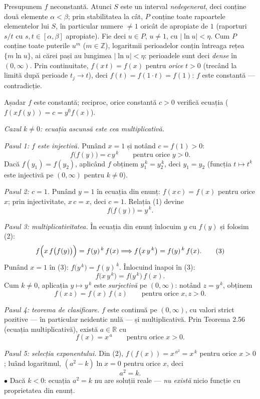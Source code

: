 Presupunem $f$ neconstantă. Atunci $S$ este un interval \emph{nedegenerat}, deci conține două elemente $\alpha<\beta$; prin stabilitatea la cât, $P$ conține toate rapoartele elementelor lui $S$, în particular numere $\neq1$ oricât de apropiate de $1$ (raporturi $s/t$ cu $s,t\in[\alpha,\beta]$ apropiate). Fie deci $u\in P$, $u\neq1$, cu $|\ln u|<\eta$. Cum $P$ conține toate puterile $u^{m}$ ($m\in\mathbb{Z}$), logaritmii perioadelor conțin întreaga rețea $\{m\ln u\}$, ai cărei pași au lungimea $|\ln u|<\eta$: perioadele sunt deci \emph{dense} în $(0,\infty)$. Prin continuitate, $f(x\,t)=f(x)$ pentru \emph{orice} $t>0$ (trecând la limită după perioade $t_{j}\to t$), deci $f(t)=f(1\cdot t)=f(1)$: $f$ este constantă --- contradicție.

Așadar $f$ este constantă; reciproc, orice constantă $c>0$ verifică ecuația ($f(xf(y))=c=y^{0}f(x)$).

\emph{Cazul $k\neq0$: ecuația ascunsă este cea multiplicativă.}

\emph{Pasul 1: $f$ este injectivă.} Punând $x=1$ și notând $c=f(1)>0$:
\[ f\bigl(f(y)\bigr)=c\,y^{\,k}\qquad\text{pentru orice }y>0 . \tag{1} \]
Dacă $f(y_{1})=f(y_{2})$, aplicând $f$ obținem $y_{1}^{\,k}=y_{2}^{\,k}$, deci $y_{1}=y_{2}$ (funcția $t\mapsto t^{k}$ este injectivă pe $(0,\infty)$ pentru $k\neq0$).

\emph{Pasul 2: $c=1$.} Punând $y=1$ în ecuația din enunț: $f(x\,c)=f(x)$ pentru orice $x$; prin injectivitate, $x\,c=x$, deci $c=1$. Relația (1) devine
\[ f\bigl(f(y)\bigr)=y^{\,k} . \tag{2} \]

\emph{Pasul 3: multiplicativitatea.} În ecuația din enunț înlocuim $y$ cu $f(y)$ și folosim (2):
\[ f\Bigl(x\,f\bigl(f(y)\bigr)\Bigr)=f(y)^{\,k}\,f(x) \Longrightarrow f\bigl(x\,y^{\,k}\bigr)=f(y)^{\,k}\,f(x) . \tag{3} \]
Punând $x=1$ în (3): $f\bigl(y^{\,k}\bigr)=f(y)^{\,k}$. Înlocuind înapoi în (3):
\[ f\bigl(x\,y^{\,k}\bigr)=f\bigl(y^{\,k}\bigr)\,f(x) . \]
Cum $k\neq0$, aplicația $y\mapsto y^{\,k}$ este \emph{surjectivă} pe $(0,\infty)$: notând $z=y^{\,k}$, obținem
\[ f(x\,z)=f(x)\,f(z)\qquad\text{pentru orice }x,z>0 . \]

\emph{Pasul 4: teorema de clasificare.} $f$ este continuă pe $(0,\infty)$, cu valori strict pozitive --- în particular neidentic nulă --- și multiplicativă. Prin Teorema 2.56 (ecuația multiplicativă), există $a\in\mathbb{R}$ cu
\[ f(x)=x^{\,a}\qquad\text{pentru orice }x>0 . \]

\emph{Pasul 5: selecția exponentului.} Din (2), $f(f(x))=x^{\,a^{2}}=x^{\,k}$ pentru orice $x>0$; luând logaritmul, $(a^{2}-k)\ln x=0$ pentru orice $x$, deci
\[ a^{2}=k . \]
$\bullet$ Dacă $k<0$: ecuația $a^{2}=k$ nu are soluții reale --- \emph{nu există} nicio funcție cu proprietatea din enunț.

